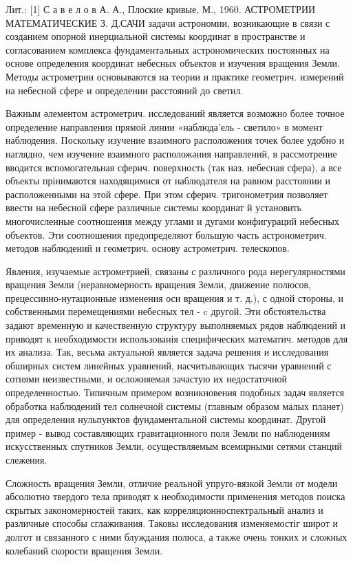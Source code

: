 \documentclass[10pt]{article}
\begin{document}
Лит.: [1] С а в е л о в А. А., Плоские кривые, М., 1960. АСТРОМЕТРИИ МАТЕМАТИЧЕСКИЕ З. Д.САЧИ задачи астрономии, возникающие в связи с созданием опорной инерциальной системы координат в пространстве и согласованием комплекса фундаментальных астрономических постоянных на основе определения координат небесных объектов и изучения вращения Земли. Методы астрометрии основываются на теории и практике геометрич. измерений на небесной сфере и определении расстояний до светил.



Важным әлементом астрометрич. исследований является возможно более точное определение направления прямой линии «наблюда'ель - светило» в момент наблюдения. Поскольку изучение взаимного расположения точек более удобно и наглядно, чем изучение взаимного расположәния направлений, в рассмотрение вводится вспомогательная сферич. поверхность (так наз. небесная сфера), а все объекты прінимаются находящимися от наблюдателя на равном расстоянии и расположенными на этой сфере. При этом сферич. тригонометрия позволяет ввести на небесной сфере различные системы координат й установить многочисленные соотношения между углами и дугами конфигураций небесных объектов. Эти соотношения предопределяют большую часть астронометрич. методов наблюдений и геометрич. основу астрометрич. телескопов.



Явления, изучаемые астрометрией, связаны с различного рода нерегулярностями вращения Земли (неравномерность вращения Земли, движение полюсов, прецессинно-нутационные изменения оси вращения и т. д.), с одной стороны, и собственными перемещениями небесных тел - c другой. Эти обстоятельства задают временную и качественную структуру выполняемых рядов наблюдений и приводят к необходимости использованія специфических математич. методов для их анализа. Так, весьма актуальной является задача решения и исследования обширных систем линейных уравнений, насчитывающих тысячи уравнений с сотнями неизвестными, и осложняемая зачастую их недостаточной определенностью. Типичным примером возникновения подобных задач является обработка наблюдений тел солнечной системы (главным образом малых планет) для определения нульпунктов фундаментальной системы координат. Другой пример - вывод составляющих гравитационного поля Земли по наблюдениям искусственных спутников Земли, осуществляемым всемирными сетями станций слежения.



Сложность вращения Земли, отличие реальной упруго-вязкой Земли от модели абсолютно твердого тела приводят к необходимости применения методов поиска скрытых закономерностей таких, как корреляционноспектральный анализ и различные способы сглаживания. Таковы исследования изменяемостіг широт и долгот и связанного с ними блуждания полюса, а также очень тонких и сложных колебаний скорости вращения Земли.
\end{document}
